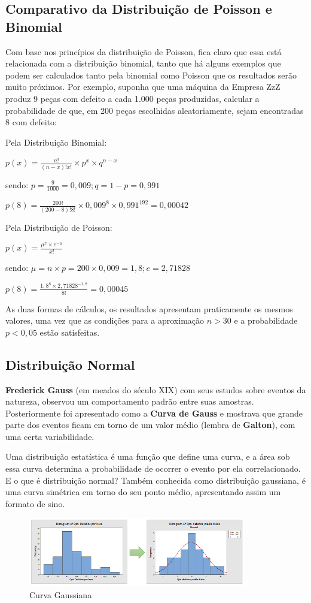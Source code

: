 \documentclass[a4paper,11pt]{article}
\begin{document}
\subsection{Comparativo da Distribuição de Poisson e Binomial}
Com base nos princípios da distribuição de Poisson, fica claro que essa está relacionada com a distribuição binomial, tanto que há alguns exemplos que podem ser calculados tanto pela binomial como Poisson que os resultados serão muito próximos. Por exemplo, suponha que uma máquina da Empresa ZzZ produz 9 peças com defeito a cada 1.000 peças produzidas, calcular a probabilidade de que, em 200 peças escolhidas aleatoriamente, sejam encontradas 8 com defeito:

Pela Distribuição Binomial:

$p(x) = \frac{n!}{(n - x)! x!} \times p^x \times q^{n - x}$

sendo: $p = \frac{9}{1000} = 0,009; q = 1 - p = 0,991$

$p(8) = \frac{200!}{(200 - 8)! 8!} \times 0,009^8 \times 0,991^192 = 0,00042$

Pela Distribuição de Poisson:

$p(x) = \frac{\mu^x \times e^{-\mu}}{x!}$

sendo: $\mu = n \times p = 200 \times 0,009 = 1,8; e = 2,71828$

$p(8) = \frac{1,8^8 \times 2,71828^{-1,8}}{8!} = 0,00045$

As duas formas de cálculos, os resultados apresentam praticamente os mesmos valores, uma vez que as condições para a aproximação $n > 30$ e a probabilidade $p < 0,05$ estão satisfeitas.

\subsection{Distribuição Normal}
\textbf{Frederick Gauss} (em meados do século XIX) com seus estudos sobre eventos da natureza, observou um comportamento padrão entre suas amostras. Posteriormente foi apresentado como a \textbf{Curva de Gauss} e mostrava que grande parte dos eventos ficam em torno de um valor médio (lembra de \textbf{Galton}), com uma certa variabilidade.

Uma distribuição estatística é uma função que define uma curva, e a área sob essa curva determina a probabilidade de ocorrer o evento por ela correlacionado. E o que é distribuição normal? Também conhecida como distribuição gaussiana, é uma curva simétrica em torno do seu ponto médio, apresentando assim um formato de sino. 
\begin{figure}[H]
	\centering
	\includegraphics[width=0.85\textwidth]{imagens/curvaGaussiana.png}
	\caption{Curva Gaussiana}
\end{figure}
\end{document}

